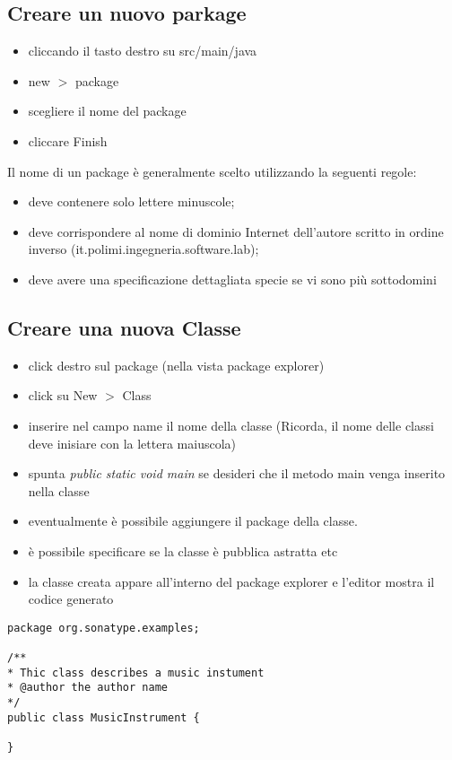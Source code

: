 \documentclass{article}
\begin{document}
\subsection{Creare un nuovo parkage}
\begin{itemize}
\item cliccando il tasto destro su src/main/java 
\item new $>$ package 
\item scegliere il nome del package 
\item cliccare Finish
\end{itemize}
Il nome di un package \`e generalmente  scelto utilizzando la seguenti regole: 
\begin{itemize}
\item  deve contenere solo lettere  minuscole;
\item deve corrispondere al nome di dominio Internet dell'autore scritto in ordine inverso (it.polimi.ingegneria.software.lab);
\item deve avere una specificazione dettagliata specie se vi sono pi\`u sottodomini
\end{itemize}


\subsection{Creare una nuova Classe}
\begin{itemize}
\item click destro sul package (nella vista package explorer)
\item click su New $>$ Class
\item inserire nel campo name il nome della classe (Ricorda, il nome delle classi deve inisiare con la lettera maiuscola)
\item spunta \emph{public static void main} se desideri che il metodo main venga inserito nella classe
\item eventualmente \`e possibile aggiungere il package della classe.
\item \`e possibile specificare se la classe \`e  pubblica astratta etc
\item la classe creata appare all'interno del package explorer e l'editor mostra il codice generato
\end{itemize}


\begin{lstlisting}
package org.sonatype.examples;

/**
* Thic class describes a music instument
* @author the author name
*/
public class MusicInstrument {
	
}
\end{lstlisting}
\end{document}
